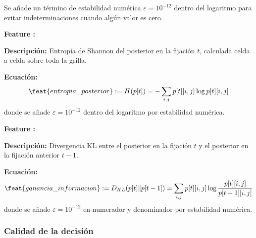 
Se añade un término de estabilidad numérica
$\varepsilon = 10^{-12}$ dentro del logaritmo para evitar
indeterminaciones cuando algún valor es cero.

\begin{featuredef}
\textbf{Feature \thetcbcounter:} 

\textbf{Descripción:} Entropía de Shannon del posterior en la fijación
$t$, calculada celda a celda sobre toda la grilla.

\textbf{Ecuación:}
\begin{equation}
    \feat{entropia\_posterior} := H(p[t]) =
    -\sum_{i,j} p[t][i,j] \log p[t][i,j]
\end{equation}
donde se añade $\varepsilon = 10^{-12}$ dentro del logaritmo por
estabilidad numérica.
\end{featuredef}

\begin{featuredef}
\textbf{Feature \thetcbcounter:} 

\textbf{Descripción:} Divergencia KL entre el posterior en la fijación
$t$ y el posterior en la fijación anterior $t-1$.

\textbf{Ecuación:}
\begin{equation}
    \feat{ganancia\_informacion} := D_{KL}(p[t] \| p[t-1]) =
    \sum_{i,j} p[t][i,j] \log \frac{p[t][i,j]}{p[t-1][i,j]}
\end{equation}
donde se añade $\varepsilon = 10^{-12}$ en numerador y denominador
por estabilidad numérica.
\end{featuredef}

\subsubsection{Calidad de la decisión}

